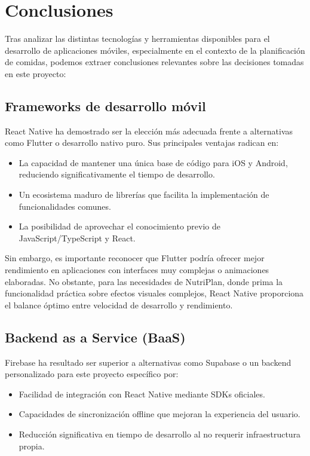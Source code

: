 \documentclass[twoside, openright, 11pt]{report}
\begin{document}
	\section{Conclusiones}
	Tras analizar las distintas tecnologías y herramientas disponibles para el desarrollo de aplicaciones móviles, especialmente en el contexto de la planificación de comidas, podemos extraer conclusiones relevantes sobre las decisiones tomadas en este proyecto:
	
	\subsection*{Frameworks de desarrollo móvil}
	React Native ha demostrado ser la elección más adecuada frente a alternativas como Flutter o desarrollo nativo puro. Sus principales ventajas radican en:
	\begin{itemize}
		\item La capacidad de mantener una única base de código para iOS y Android, reduciendo significativamente el tiempo de desarrollo.
		\item Un ecosistema maduro de librerías que facilita la implementación de funcionalidades comunes.
		\item La posibilidad de aprovechar el conocimiento previo de JavaScript/TypeScript y React.
	\end{itemize}
	
	Sin embargo, es importante reconocer que Flutter podría ofrecer mejor rendimiento en aplicaciones con interfaces muy complejas o animaciones elaboradas. No obstante, para las necesidades de NutriPlan, donde prima la funcionalidad práctica sobre efectos visuales complejos, React Native proporciona el balance óptimo entre velocidad de desarrollo y rendimiento.
	
	\subsection*{Backend as a Service (BaaS)}
	Firebase ha resultado ser superior a alternativas como Supabase o un backend personalizado para este proyecto específico por:
	\begin{itemize}
		\item Facilidad de integración con React Native mediante SDKs oficiales.
		\item Capacidades de sincronización offline que mejoran la experiencia del usuario.
		\item Reducción significativa en tiempo de desarrollo al no requerir infraestructura propia.
	\end{itemize}
	
\end{document}
